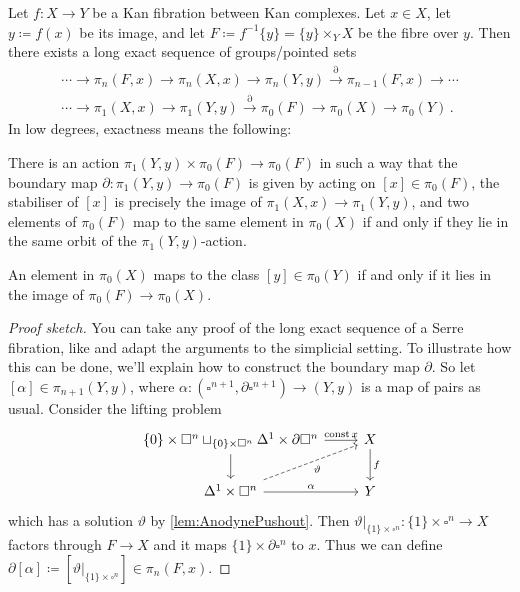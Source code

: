 \begin{lem}\label{lem:FibrationSequence}\label{lem:LongExactFibrationSequence}
	Let $f\colon X\rightarrow Y$ be a Kan fibration between Kan complexes. Let $x\in X$, let $y\coloneqq f(x)$ be its image, and let $F\coloneqq f^{-1}\{y\}=\{y\}\times_YX$ be the fibre over $y$. Then there exists a long exact sequence of groups/pointed sets
	\begin{multline*}
		\dotsb\longrightarrow\pi_n(F,x)\longrightarrow \pi_n(X,x)\longrightarrow\pi_n(Y,y)\overset{\partial}{\longrightarrow}\pi_{n-1}(F,x)\longrightarrow\dotsb\\
		\dotsb\longrightarrow\pi_1(X,x)\longrightarrow\pi_1(Y,y)\overset{\partial}{\longrightarrow}\pi_0(F)\longrightarrow\pi_0(X)\longrightarrow\pi_0(Y)\,.
	\end{multline*}
	In low degrees, exactness means the following:
	\begin{alphanumerate}
		\item There is an action $\pi_1(Y,y)\times\pi_0(F)\rightarrow\pi_0(F)$ in such a way that the boundary map $\partial\colon \pi_1(Y,y)\rightarrow \pi_0(F)$ is given by acting on $[x]\in \pi_0(F)$, the stabiliser of $[x]$ is precisely the image of $\pi_1(X,x)\rightarrow\pi_1(Y,y)$, and two elements of $\pi_0(F)$ map to the same element in $\pi_0(X)$ if and only if they lie in the same orbit of the $\pi_1(Y,y)$-action.\label{enum:ActionOfPi1}
		\item An element in $\pi_0(X)$ maps to the class $[y]\in\pi_0(Y)$ if and only if it lies in the image of $\pi_0(F)\rightarrow \pi_0(X)$.
	\end{alphanumerate}
\end{lem}
\begin{proof}[Proof sketch]
	You can take any proof of the long exact sequence of a Serre fibration, like \cite[Theorem~\href{https://pi.math.cornell.edu/~hatcher/AT/AT.pdf\#page=385}{4.41}]{Hatcher} and adapt the arguments to the simplicial setting. To illustrate how this can be done, we'll explain how to construct the boundary map $\partial$. So let $[\alpha]\in\pi_{n+1}(Y,y)$, where $\alpha\colon(\square^{n+1},\partial\square^{n+1})\rightarrow(Y,y)$ is a map of pairs as usual. Consider the lifting problem
	\begin{equation*}
		\begin{tikzcd}
			\{0\}\times\square^n\sqcup_{\{0\}\times\square^n}\Delta^1\times\partial\square^n\rar["\const x"]\dar & X\dar["f"]\\
			\Delta^1\times\square^n\rar["\alpha"]\urar[dashed,"\vartheta"'] & Y
		\end{tikzcd}
	\end{equation*}
	which has a solution $\vartheta$ by \cref{lem:AnodynePushout}. Then $\vartheta|_{\{1\}\times\square^n}\colon \{1\}\times\square^n\rightarrow X$ factors through $F\rightarrow X$ and it maps $\{1\}\times \partial\square^n$ to $x$. Thus we can define $\partial[\alpha]\coloneqq [\vartheta|_{\{1\}\times\square^n}]\in\pi_n(F,x)$.
\end{proof}
